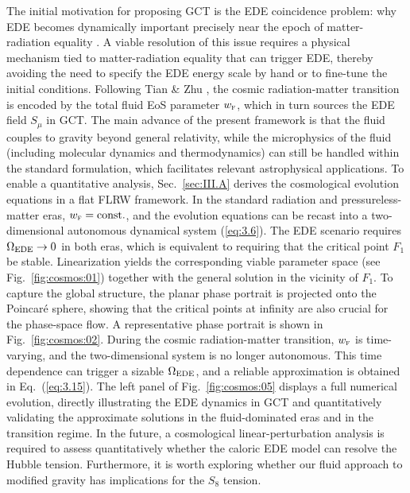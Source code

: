\documentclass[aps,prd,twocolumn]{revtex4-2}
\newcommand\subEDE{{\rm EDE}}
\newcommand\subF{\textsc{f}}
\begin{document}
The initial motivation for proposing GCT is the EDE coincidence problem: why EDE becomes dynamically important precisely near the epoch of matter-radiation equality \cite{Lin2019.PRD.100.063542,Sakstein2020.PRL.124.161301}. A viable resolution of this issue requires a physical mechanism tied to matter-radiation equality that can trigger EDE, thereby avoiding the need to specify the EDE energy scale by hand or to fine-tune the initial conditions. Following Tian \& Zhu \cite{Tian2021.PRD.103.043518,Tian2023.PRD.107.103507}, the cosmic radiation-matter transition is encoded by the total fluid EoS parameter $w_\subF$, which in turn sources the EDE field $S_\mu$ in GCT. The main advance of the present framework is that the fluid couples to gravity beyond general relativity, while the microphysics of the fluid (including molecular dynamics and thermodynamics) can still be handled within the standard formulation, which facilitates relevant astrophysical applications. To enable a quantitative analysis, Sec.~\ref{sec:III.A} derives the cosmological evolution equations in a flat FLRW framework. In the standard radiation and pressureless-matter eras, $w_\subF=\mathrm{const.}$, and the evolution equations can be recast into a two-dimensional autonomous dynamical system (\ref{eq:3.6}). The EDE scenario requires $\Omega_\subEDE\rightarrow0$ in both eras, which is equivalent to requiring that the critical point $F_1$ be stable. Linearization yields the corresponding viable parameter space (see Fig.~\ref{fig:cosmos:01}) together with the general solution in the vicinity of $F_1$. To capture the global structure, the planar phase portrait is projected onto the Poincar\'e sphere, showing that the critical points at infinity are also crucial for the phase-space flow. A representative phase portrait is shown in Fig.~\ref{fig:cosmos:02}. During the cosmic radiation-matter transition, $w_\subF$ is time-varying, and the two-dimensional system is no longer autonomous. This time dependence can trigger a sizable $\Omega_\subEDE$, and a reliable approximation is obtained in Eq.~(\ref{eq:3.15}). The left panel of Fig.~\ref{fig:cosmos:05} displays a full numerical evolution, directly illustrating the EDE dynamics in GCT and quantitatively validating the approximate solutions in the fluid-dominated eras and in the transition regime. In the future, a cosmological linear-perturbation analysis is required to assess quantitatively whether the caloric EDE model can resolve the Hubble tension. Furthermore, it is worth exploring whether our fluid approach to modified gravity has implications for the $S_8$ tension.
\end{document}
